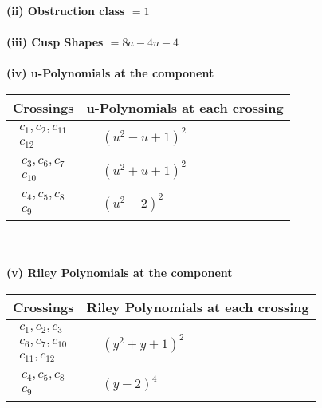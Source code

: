 \documentclass[1p]{elsarticle_modified}
\theoremstyle{definition}
\begin{document}
\flushleft \textbf{(ii) Obstruction class $= 1$}\\~\\
\flushleft \textbf{(iii) Cusp Shapes $= 8 a-4 u-4$}\\~\\
\newpage\renewcommand{\arraystretch}{1}
\flushleft \textbf{(iv) u-Polynomials at the component}\newline \\
\begin{tabular}{m{50pt}|m{274pt}}
Crossings & \hspace{64pt}u-Polynomials at each crossing \\
\hline $$\begin{aligned}c_{1},c_{2},c_{11}\\c_{12}\end{aligned}$$&$\begin{aligned}
&(u^2- u+1)^2
\end{aligned}$\\
\hline $$\begin{aligned}c_{3},c_{6},c_{7}\\c_{10}\end{aligned}$$&$\begin{aligned}
&(u^2+u+1)^2
\end{aligned}$\\
\hline $$\begin{aligned}c_{4},c_{5},c_{8}\\c_{9}\end{aligned}$$&$\begin{aligned}
&(u^2-2)^2
\end{aligned}$\\
\hline
\end{tabular}\\~\\
\newpage\renewcommand{\arraystretch}{1}
\flushleft \textbf{(v) Riley Polynomials at the component}\newline \\
\begin{tabular}{m{50pt}|m{274pt}}
Crossings & \hspace{64pt}Riley Polynomials at each crossing \\
\hline $$\begin{aligned}c_{1},c_{2},c_{3}\\c_{6},c_{7},c_{10}\\c_{11},c_{12}\end{aligned}$$&$\begin{aligned}
&(y^2+y+1)^2
\end{aligned}$\\
\hline $$\begin{aligned}c_{4},c_{5},c_{8}\\c_{9}\end{aligned}$$&$\begin{aligned}
&(y-2)^4
\end{aligned}$\\
\hline
\end{tabular}\\~\\
\end{document}
